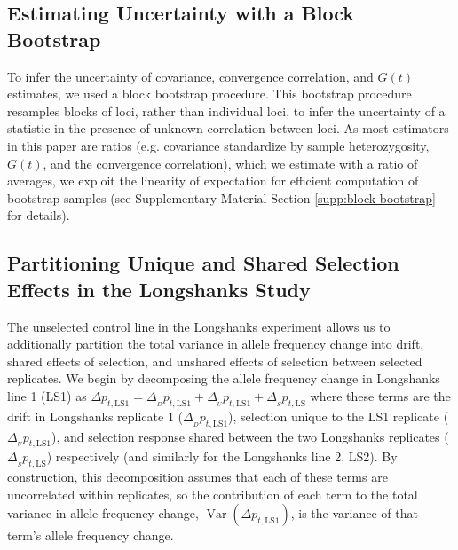 \documentclass[11pt]{article}
\DeclareMathOperator{\var}{Var}
\begin{document}
\subsection{Estimating Uncertainty with a Block Bootstrap}

To infer the uncertainty of covariance, convergence correlation, and $G(t)$
estimates, we used a block bootstrap procedure. This bootstrap procedure
resamples blocks of loci, rather than individual loci, to infer the
uncertainty of a statistic in the presence of unknown correlation between loci.
As most estimators in this paper are ratios (e.g. covariance standardize by
sample heterozygosity, $G(t)$, and the convergence correlation), which we
estimate with a ratio of averages, we exploit the linearity of expectation for
efficient computation of bootstrap samples (see Supplementary Material Section
\ref{supp:block-bootstrap} for details).

\subsection{Partitioning Unique and Shared Selection Effects in the Longshanks Study}
\label{sec:mm-partition}

The unselected control line in the Longshanks experiment allows us to
additionally partition the total variance in allele frequency change into
drift, shared effects of selection, and unshared effects of selection between
selected replicates. We begin by decomposing the allele frequency change in
Longshanks line 1 (LS1) as $\Delta p_{t,\mathrm{LS1}} = \Delta_{_{D}}
p_{t,\mathrm{LS1}} + \Delta_{_{U}} p_{t,\mathrm{LS1}} + \Delta_{_S}
p_{t,\mathrm{LS}}$ where these terms are the drift in Longshanks replicate 1
($\Delta_{_D} p_{t,\mathrm{LS1}}$), selection unique to the LS1 replicate
($\Delta_{_U} p_{t,\mathrm{LS1}}$), and selection response shared between the
two Longshanks replicates ($\Delta_{_S} p_{t,\mathrm{LS}}$) respectively (and
similarly for the Longshanks line 2, LS2). By construction, this decomposition
assumes that each of these terms are uncorrelated within replicates, so the
contribution of each term to the total variance in allele frequency change,
$\var(\Delta p_{t,\mathrm{LS1}})$, is the variance of that term's allele
frequency change. 
\end{document}
